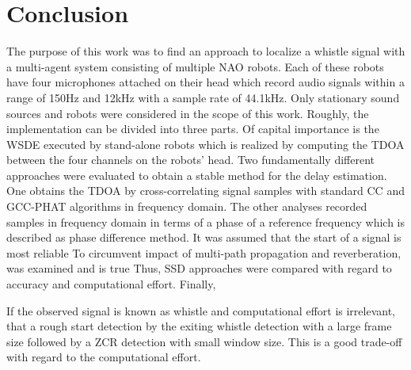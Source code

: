 \chapter{Conclusion}
\label{chap:05_conclusion}

The purpose of this work was to find an approach to localize a whistle
signal with a multi-agent system consisting of multiple NAO robots.
Each of these robots have four microphones attached on their head which
record audio signals within a range of 150\si{\hertz} and 12\si{\kilo\hertz}
with a sample rate of 44.1\si{\kilo\hertz}.
Only stationary sound sources and robots were considered in the scope of this
work.
Roughly, the implementation can be divided into three parts.
Of capital importance is the \acf{WSDE} executed by stand-alone robots which
is realized by computing the \ac{TDOA} between the four channels on the robots' head.
Two fundamentally different approaches were evaluated to obtain a stable method
for the delay estimation.
One obtains the \ac{TDOA} by cross-correlating signal samples with standard
\acf{CC} and \acf{GCC-PHAT} algorithms in frequency domain.
The other analyses recorded samples in frequency domain in terms of
a phase of a reference frequency which is described as phase difference method.
It was assumed that the start of a signal is most reliable 
To circumvent impact of multi-path propagation and reverberation, 
was examined and is true
Thus, \acf{SSD} approaches were compared with regard to accuracy and computational effort.
Finally, 


If the observed signal is known as whistle and computational effort is
irrelevant, 
that a rough start detection by the exiting whistle detection
with a large frame size followed by a \ac{ZCR} detection with small
window size.
This is a good trade-off with regard to the computational effort.



